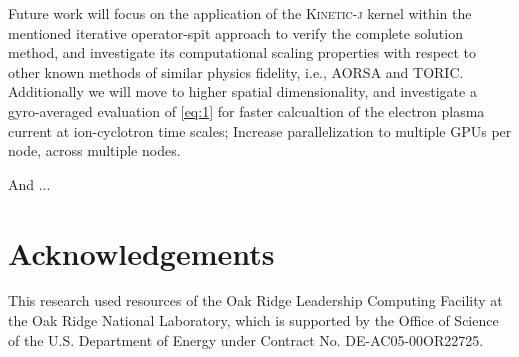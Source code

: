\documentclass[final,5p,times,twocolumn]{elsarticle}
\newcommand{\kj}{\textsc{Kinetic-j}\xspace}
\begin{document}
Future work will focus on the application of the \kj kernel within the mentioned iterative operator-spit approach to verify the complete solution method, and investigate its computational scaling properties with respect to other known methods of similar physics fidelity, i.e., AORSA and TORIC. Additionally we will move to higher spatial dimensionality, and investigate a gyro-averaged evaluation of \ref{eq:1} for faster calcualtion of the electron plasma current at ion-cyclotron time scales; Increase parallelization to multiple GPUs per node, across multiple nodes.

And ...

\section{Acknowledgements}
\label{section:acknowledgements}
This research used resources of the Oak Ridge Leadership Computing Facility at the Oak Ridge National Laboratory, which is supported by the Office of Science of the U.S. Department of Energy under Contract No. DE-AC05-00OR22725.














\end{document}
